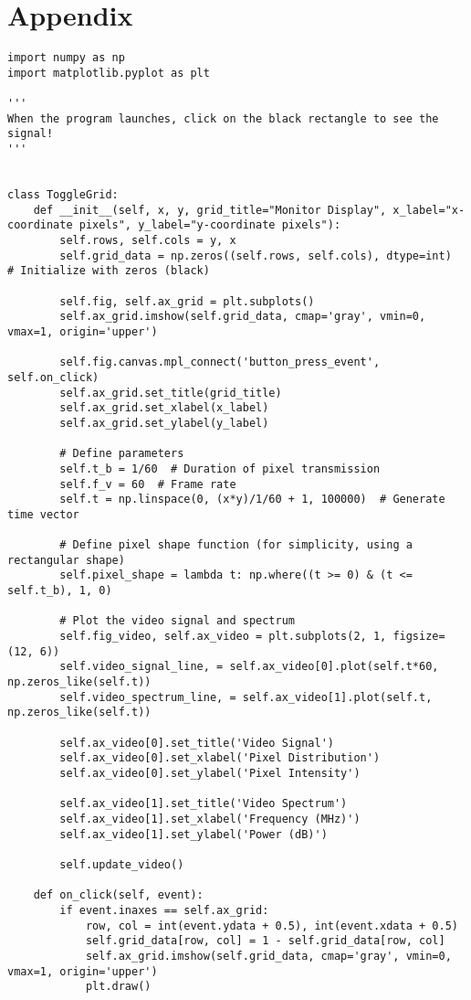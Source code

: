 \documentclass{article}
\begin{document}
\section{Appendix}
\begin{lstlisting}
import numpy as np
import matplotlib.pyplot as plt

'''
When the program launches, click on the black rectangle to see the signal!
'''


class ToggleGrid:
    def __init__(self, x, y, grid_title="Monitor Display", x_label="x-coordinate pixels", y_label="y-coordinate pixels"):
        self.rows, self.cols = y, x
        self.grid_data = np.zeros((self.rows, self.cols), dtype=int)  # Initialize with zeros (black)

        self.fig, self.ax_grid = plt.subplots()
        self.ax_grid.imshow(self.grid_data, cmap='gray', vmin=0, vmax=1, origin='upper')

        self.fig.canvas.mpl_connect('button_press_event', self.on_click)
        self.ax_grid.set_title(grid_title)
        self.ax_grid.set_xlabel(x_label)
        self.ax_grid.set_ylabel(y_label)
        
        # Define parameters
        self.t_b = 1/60  # Duration of pixel transmission
        self.f_v = 60  # Frame rate 
        self.t = np.linspace(0, (x*y)/1/60 + 1, 100000)  # Generate time vector

        # Define pixel shape function (for simplicity, using a rectangular shape)
        self.pixel_shape = lambda t: np.where((t >= 0) & (t <= self.t_b), 1, 0)

        # Plot the video signal and spectrum
        self.fig_video, self.ax_video = plt.subplots(2, 1, figsize=(12, 6))
        self.video_signal_line, = self.ax_video[0].plot(self.t*60, np.zeros_like(self.t))
        self.video_spectrum_line, = self.ax_video[1].plot(self.t, np.zeros_like(self.t))

        self.ax_video[0].set_title('Video Signal')
        self.ax_video[0].set_xlabel('Pixel Distribution')
        self.ax_video[0].set_ylabel('Pixel Intensity')

        self.ax_video[1].set_title('Video Spectrum')
        self.ax_video[1].set_xlabel('Frequency (MHz)')
        self.ax_video[1].set_ylabel('Power (dB)')

        self.update_video()

    def on_click(self, event):
        if event.inaxes == self.ax_grid:
            row, col = int(event.ydata + 0.5), int(event.xdata + 0.5)
            self.grid_data[row, col] = 1 - self.grid_data[row, col]
            self.ax_grid.imshow(self.grid_data, cmap='gray', vmin=0, vmax=1, origin='upper')
            plt.draw()


\end{lstlisting}
\end{document}
